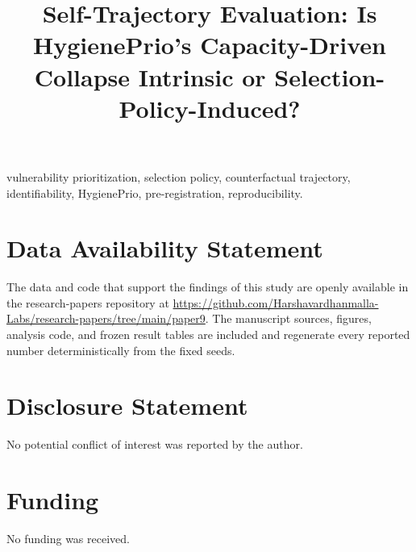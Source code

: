 \documentclass[journal]{IEEEtran}
\title{Self-Trajectory Evaluation: Is HygienePrio's Capacity-Driven
Collapse Intrinsic or Selection-Policy-Induced?}
\author{%
  \IEEEauthorblockN{Harshavardhan Malla}
  \IEEEauthorblockA{Independent Researcher\\ Email: harshavardhanmalla75@gmail.com}%
}
\begin{document}
\maketitle

\begin{abstract}

\end{abstract}

\begin{IEEEkeywords}
vulnerability prioritization, selection policy, counterfactual trajectory,
identifiability, HygienePrio, pre-registration, reproducibility.
\end{IEEEkeywords}














\section*{Data Availability Statement}
The data and code that support the findings of this study are openly available in the research-papers repository at \url{https://github.com/Harshavardhanmalla-Labs/research-papers/tree/main/paper9}. The manuscript sources, figures, analysis code, and frozen result tables are included and regenerate every reported number deterministically from the fixed seeds.

\section*{Disclosure Statement}
No potential conflict of interest was reported by the author.

\section*{Funding}
No funding was received.
\end{document}
